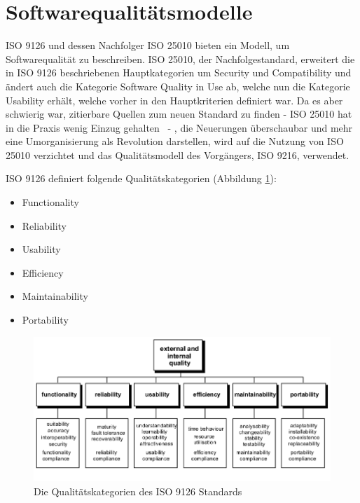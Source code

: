 \section{Softwarequalitätsmodelle}
ISO 9126 \cite{ISO_SQ} und dessen Nachfolger ISO 25010 \cite{ISO_SQ2} bieten ein Modell, um Softwarequalität zu beschreiben. ISO 25010, der Nachfolgestandard, erweitert die in ISO 9126 beschriebenen Hauptkategorien um Security und Compatibility und ändert auch die Kategorie Software Quality in Use ab, welche nun die Kategorie Usability erhält, welche vorher in den Hauptkriterien definiert war. Da es aber schwierig war, zitierbare Quellen zum neuen Standard zu finden - ISO 25010 hat \glqq in die Praxis wenig Einzug gehalten\grqq \ \cite[S. 60]{effektiv} - , die Neuerungen überschaubar und mehr eine Umorganisierung als Revolution darstellen, wird auf die Nutzung von ISO 25010 verzichtet und das Qualitätsmodell des Vorgängers, ISO 9216, verwendet.

ISO 9126 definiert folgende Qualitätskategorien (Abbildung \ref{fig:iso9126}):

\begin{itemize}
  \item \glqq Functionality\grqq
  \item \glqq Reliability\grqq
  \item \glqq Usability\grqq
  \item \glqq Efficiency\grqq
  \item \glqq Maintainability\grqq
  \item \glqq Portability\grqq
\end{itemize}

\begin{figure}[H]
    \centering
    \includegraphics[scale=0.54]{img/iso9126.png}
    \caption{Die Qualitätskategorien des ISO 9126 Standards\cite[S. 7]{ISO_SQ}}
    \label{fig:iso9126}
\end{figure}

